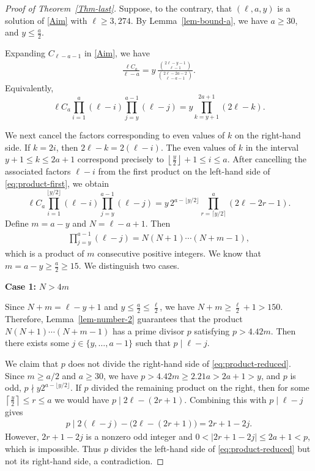 \documentclass[11pt]{article}
\begin{document}
\begin{proof}[Proof of Theorem~\ref{Thm-last}]
Suppose, to the contrary, that
$(\ell,a,y)$ is a solution of \eqref{Aim} with
$\ell\ge 3{,}274$. 
By Lemma~\ref{lem-bound-a}, we have $a\ge30$, and $y\le\frac{a}{2}$.

Expanding $C_{\ell-a-1}$ in \eqref{Aim}, we have
\begin{align*}
\frac{\ell C_a}{\ell-a}
=
y\,
\frac{\binom{2\ell-y-1}{\ell-1}}
     {\binom{2\ell-2a-2}{\ell-a-1}}.
\end{align*}
Equivalently,
\begin{equation}\label{eq:product-first}
\ell C_a
\prod_{i=1}^{a}(\ell-i)
\prod_{j=y}^{a-1}(\ell-j)
=
y\prod_{k=y+1}^{2a+1}(2\ell-k).
\end{equation}

We next cancel the factors corresponding to even values of $k$ on
the right-hand side. If $k=2i$, then
$2\ell-k=2(\ell-i)$.
The even values of $k$ in the interval
$y+1\le k\le2a+1$ correspond precisely to
$\left\lfloor\frac{y}{2}\right\rfloor+1
\le i\le a$.
After cancelling the associated factors $\ell-i$ from the first
product on the left-hand side of \eqref{eq:product-first}, we obtain
\begin{equation}\label{eq:product-reduced}
\ell C_a
\prod_{i=1}^{\lfloor y/2\rfloor}(\ell-i)
\prod_{j=y}^{a-1}(\ell-j)
=
y\,2^{a-\lfloor y/2\rfloor}
\prod_{r=\lceil y/2\rceil}^{a}(2\ell-2r-1).
\end{equation}
Define $m=a-y$ and $N=\ell-a+1$.
Then
\begin{align*}
    \prod_{j=y}^{a-1}(\ell-j)
=
N(N+1)\cdots(N+m-1),
\end{align*}
which is a product of $m$ consecutive positive integers. 
We know that $ m=a-y\ge\frac{a}{2}\ge15$.
We distinguish two cases.

\noindent \textbf{Case 1:} $N>4m$

Since $N+m=\ell-y+1$
and $y\le\frac{a}{2}\le\frac{\ell}{2}$,
we have
$N+m\ge\frac{\ell}{2}+1>150$.
Therefore, Lemma~\ref{lem-number-2} guarantees that the product
$N(N+1)\cdots(N+m-1)$
has a prime divisor $p$ satisfying $p>4.42m$.
Then there exists some $j\in\{y,\ldots,a-1\}$ such that $p\mid\ell-j$.

We claim that $p$ does not divide the right-hand side of
\eqref{eq:product-reduced}.
Since $m\ge a/2$ and $a\ge30$, we have $p>4.42m\ge2.21a>2a+1>y$, and $p$ is odd, $p\nmid y2^{a-\lfloor y/2\rfloor}$. If $p$ divided the remaining
product on the right, then for some
$\left\lceil\frac{y}{2}\right\rceil\le r\le a$
we would have $p\mid 2\ell-(2r+1)$.
Combining this with $p\mid\ell-j$ gives
\begin{align*}
p\mid
2(\ell-j)-\bigl(2\ell-(2r+1)\bigr)
=
2r+1-2j.
\end{align*}
However, $2r+1-2j$ is a nonzero odd integer and $0<|2r+1-2j|\le2a+1<p$,
which is impossible. Thus $p$ divides the left-hand side of
\eqref{eq:product-reduced} but not its right-hand side, a
contradiction.


\end{proof}
\end{document}
